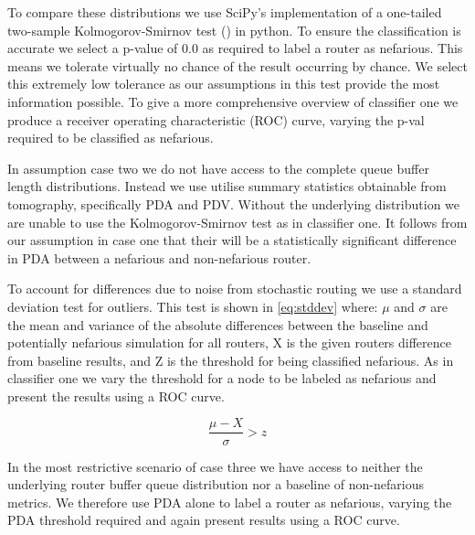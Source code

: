   To compare these distributions we use SciPy's implementation of a one-tailed two-sample Kolmogorov-Smirnov test (\cite{chakravarti_handbook_1967}) in python. To ensure the classification is accurate we select a p-value of 0.0 as required to label a router as nefarious. This means we tolerate virtually no chance of the result occurring by chance. We select this extremely low tolerance as our assumptions in this test provide the most information possible. To give a more comprehensive overview of classifier one we produce a receiver operating characteristic (ROC) curve, varying the p-val required to be classified as nefarious.\par
  In assumption case two we do not have access to the complete queue buffer length distributions. Instead we use utilise summary statistics obtainable from tomography, specifically PDA and PDV. Without the underlying distribution we are unable to use the Kolmogorov-Smirnov test as in classifier one. It follows from our assumption in case one that their will be a statistically significant difference in PDA between a nefarious and non-nefarious router.\par
  To account for differences due to noise from stochastic routing we use a standard deviation test for outliers. This test is shown in \cref{eq:stddev} where: $\mu$ and $\sigma$ are the mean and variance of the absolute differences between the baseline and potentially nefarious simulation for all routers, X is the given routers difference from baseline results, and Z is the threshold for being classified nefarious. As in classifier one we vary the threshold for a node to be labeled as nefarious and present the results using a ROC curve.\par
  
  \begin{equation}
  \label{eq:stddev}
      \frac{\mu-X}{\sigma}>z
  \end{equation}
  
  In the most restrictive scenario of case three we have access to neither the underlying router buffer queue distribution nor a baseline of non-nefarious metrics. We therefore use PDA alone to label a router as nefarious, varying the PDA threshold required and again present results using a ROC curve.\par
  

